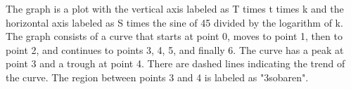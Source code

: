 The graph is a plot with the vertical axis labeled as T times t times k and the horizontal axis labeled as S times the sine of 45 divided by the logarithm of k. The graph consists of a curve that starts at point 0, moves to point 1, then to point 2, and continues to points 3, 4, 5, and finally 6. The curve has a peak at point 3 and a trough at point 4. There are dashed lines indicating the trend of the curve. The region between points 3 and 4 is labeled as "3sobaren".